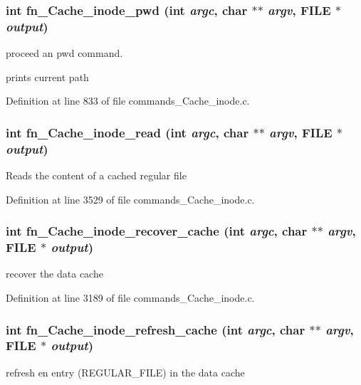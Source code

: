 \subsubsection[{fn\_\-Cache\_\-inode\_\-pwd}]{\setlength{\rightskip}{0pt plus 5cm}int fn\_\-Cache\_\-inode\_\-pwd (int {\em argc}, \/  char $\ast$$\ast$ {\em argv}, \/  FILE $\ast$ {\em output})}\label{commands_8h_aaeb47365ab7e7c924c2a6caf763e818f}
proceed an pwd command.

prints current path 

Definition at line 833 of file commands\_\-Cache\_\-inode.c.
\subsubsection[{fn\_\-Cache\_\-inode\_\-read}]{\setlength{\rightskip}{0pt plus 5cm}int fn\_\-Cache\_\-inode\_\-read (int {\em argc}, \/  char $\ast$$\ast$ {\em argv}, \/  FILE $\ast$ {\em output})}\label{commands_8h_a83f4bb6a3477931a870a2c45d5e1aa28}
Reads the content of a cached regular file 

Definition at line 3529 of file commands\_\-Cache\_\-inode.c.
\subsubsection[{fn\_\-Cache\_\-inode\_\-recover\_\-cache}]{\setlength{\rightskip}{0pt plus 5cm}int fn\_\-Cache\_\-inode\_\-recover\_\-cache (int {\em argc}, \/  char $\ast$$\ast$ {\em argv}, \/  FILE $\ast$ {\em output})}\label{commands_8h_a88f63b3c17722d4912113b8ecf0b247b}
recover the data cache 

Definition at line 3189 of file commands\_\-Cache\_\-inode.c.
\subsubsection[{fn\_\-Cache\_\-inode\_\-refresh\_\-cache}]{\setlength{\rightskip}{0pt plus 5cm}int fn\_\-Cache\_\-inode\_\-refresh\_\-cache (int {\em argc}, \/  char $\ast$$\ast$ {\em argv}, \/  FILE $\ast$ {\em output})}\label{commands_8h_a006ca27f7fd03ab4245e4a5b28fe4784}
refresh en entry (REGULAR\_\-FILE) in the data cache 

